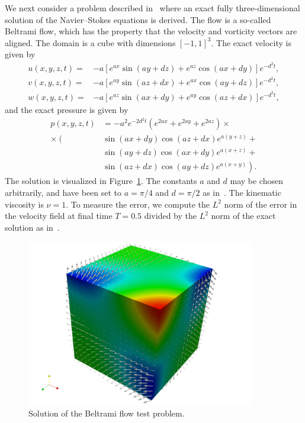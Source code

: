 We next consider a problem described in~\cite{EthierSteinmann1994} where an
exact fully three-dimensional solution of the Navier--Stokes equations
is derived. The flow is a so-called Beltrami flow, which has the
property that the velocity and vorticity vectors are aligned. The
domain is a cube with dimensions $[-1,1]^3$. The exact velocity is
given by
\begin{equation*}
  \begin{split}
    u(x,y,z,t)= & -a [ e^{ax} \sin(ay + dz)  + e^{az} \cos(ax + dy) ] e^{-d^{2}t}, \\
    v(x,y,z,t)= & -a [ e^{ay} \sin(az + dx)  + e^{ax} \cos(ay + dz) ] e^{-d^{2}t}, \\
    w(x,y,z,t)= & -a [ e^{az} \sin(ax + dy)  + e^{ay} \cos(az + dx) ] e^{-d^{2}t},
  \end{split}
\end{equation*}
and the exact pressure is given by
\begin{equation*}
  \begin{split}
    p(x,y,z,t) &= - a^2 e^{-2d^{2}t}
    \left(e^{2ax} + e^{2ay} + e^{2az}\right) \times \\
    \times
    \left( \right.
    &\sin(ax + dy) \cos(az + dx) e^{a(y+z)} + \\
    &\sin(ay + dz) \cos(ax + dy) e^{a(x+z)} + \\
    &\sin(az + dx) \cos(ay + dz) e^{a(x+y)}
    \left. \right).
  \end{split}
\end{equation*}
The solution is visualized in Figure~\ref{fig:beltrami}. The constants
$a$ and $d$ may be chosen arbitrarily, and have been set to $a=\pi/4$
and $d=\pi/2$ as in~\cite{EthierSteinmann1994}. The kinematic viscosity is $\nu
= 1$. To measure the error, we compute the $L^2$ norm of the error in
the velocity field at final time $T = 0.5$ divided by the $L^2$ norm
of the exact solution as in~\cite{EthierSteinmann1994}.

\begin{figure}
  \begin{center}
    \includegraphics[width=10cm]{chapters/kvs-1/pdf/new_beltrami_illustration.pdf}
    \caption{Solution of the Beltrami flow test problem.}
    \label{fig:beltrami}
  \end{center}
\end{figure}

